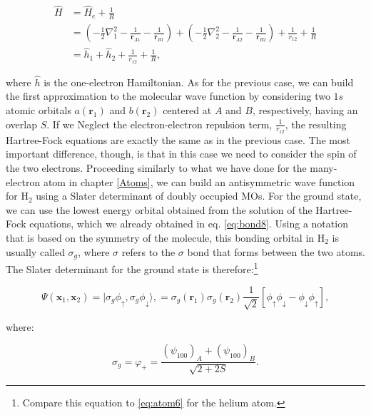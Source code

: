 \documentclass[
  9pt,
]{extbook}
\theoremstyle{definition}
\theoremstyle{definition}
\theoremstyle{definition}
\theoremstyle{remark}
\begin{document}
\begin{equation}
\begin{aligned}
\hat{H} &= \hat{H}_e+\frac{1}{R} \\
&=\left( -\frac{1}{2}\nabla^2_1-\frac{1}{\mathbf{r}_{A1}}-\frac{1}{\mathbf{r}_{B1}} \right)+\left( -\frac{1}{2}\nabla^2_2-\frac{1}{\mathbf{r}_{A2}}-\frac{1}{\mathbf{r}_{B2}} \right)+\frac{1}{r_{12}}+\frac{1}{R}\\
&= \hat{h}_1+\hat{h}_2+\frac{1}{r_{12}}+\frac{1}{R},
\end{aligned}
\label{eq:bond11}
\end{equation}

where \(\hat{h}\) is the one-electron Hamiltonian. As for the previous case, we can build the first approximation to the molecular wave function by considering two \(1s\) atomic orbitals \(a(\mathbf{r}_1)\) and \(b(\mathbf{r}_2)\) centered at \(A\) and \(B\), respectively, having an overlap \(S\). If we Neglect the electron-electron repulsion term, \(\frac{1}{r_{12}}\), the resulting Hartree-Fock equations are exactly the same as in the previous case. The most important difference, though, is that in this case we need to consider the spin of the two electrons. Proceeding similarly to what we have done for the many-electron atom in chapter \ref{Atoms}, we can build an antisymmetric wave function for \(\text{H}_2\) using a Slater determinant of doubly occupied MOs. For the ground state, we can use the lowest energy orbital obtained from the solution of the Hartree-Fock equations, which we already obtained in eq. \eqref{eq:bond8}. Using a notation that is based on the symmetry of the molecule, this bonding orbital in \(\text{H}_2\) is usually called \(\sigma_g\), where \(\sigma\) refers to the \(\sigma\) bond that forms between the two atoms. The Slater determinant for the ground state is therefore:\footnote{Compare this equation to \eqref{eq:atom6} for the helium atom.}

\begin{equation}
\Psi (\mathbf{x}_{1},\mathbf{x}_{2})= |\sigma_{g}\phi_{\uparrow},\sigma_{g}\phi_{\downarrow}\rangle,=\sigma_{g}(\mathbf{r}_1)\sigma_{g}(\mathbf{r}_2) \frac{1}{\sqrt{2}} \left[ \phi_{\uparrow}\phi_{\downarrow} - \phi_{\downarrow}\phi_{\uparrow} \right],
\label{eq:bond12}
\end{equation}

where:

\begin{equation}
\sigma_{g}=\varphi_{+}=\frac{\left(\psi_{100}\right)_A+\left(\psi_{100}\right)_B}{\sqrt{2+2S}}.
\label{eq:bond13}
\end{equation}
\end{document}
